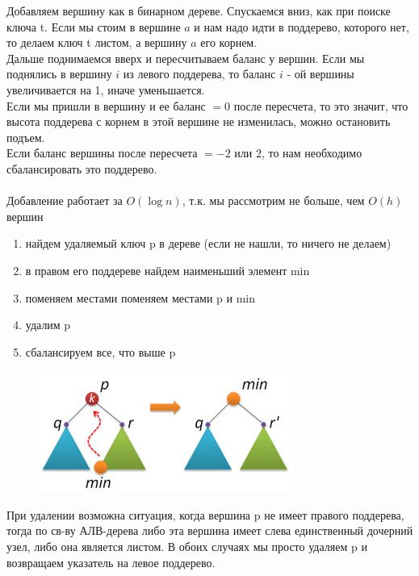 \documentclass[discrete.tex]{subfiles}
\begin{document}
\begin{definition} 
    Добавляем вершину как в бинарном дереве. Спускаемся вниз, как при поиске ключа t.
    Если мы стоим в вершине $a$ и нам надо идти в поддерево, которого нет, то делаем
    ключ t листом, а вершину $a$ его корнем. \\
    Дальше поднимаемся вверх и пересчитываем баланс у вершин.
    Если мы поднялись в вершину $i$ из левого поддерева, то
    баланс $i$ - ой вершины увеличивается на 1, иначе уменьшается.\\
    Если мы пришли в
    вершину и ее баланс $ = 0$ после пересчета, то это значит, что высота поддерева с
    корнем в этой вершине не изменилась, можно остановить подъем.\\
    Если баланс вершины после пересчета $= -2 $ или $ 2$, то нам необходимо сбалансировать
    это поддерево.\\
    \\
    Добавление работает за $O(\log n)$, т.к. мы рассмотрим не больше, чем $O(h)$
    вершин

\end{definition}

\begin{definition} 
    \begin{enumerate}
        \item найдем удаляемый ключ p в дереве (если не нашли, то ничего не делаем)
        \item в правом его поддереве найдем наименьший элемент min
        \item поменяем местами поменяем местами p и min
        \item удалим p
        \item сбалансируем все, что выше p
    \end{enumerate}
    \begin{figure}[H]
            \includegraphics[scale=0.5]{pics/33_4}
            \centering
    \end{figure}
    При удалении возможна ситуация, когда вершина p не имеет правого поддерева, тогда
    по св-ву АЛВ-дерева либо эта вершина имеет слева единственный дочерний узел,
    либо она является листом. В обоих случаях мы просто удаляем p и возвращаем указатель
    на левое поддерево.
\end{definition}
\end{document}
